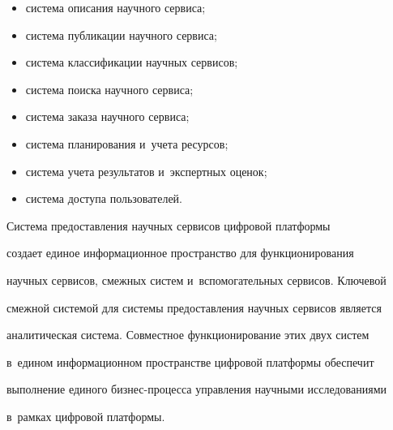      \begin{itemize}


     \item система описания научного сервиса;\\[-13.5pt]


     \item система публикации научного сервиса;\\[-13.5pt]


     \item система классификации научных сервисов;\\[-13.5pt]


     \item система поиска научного сервиса;\\[-13.5pt]


     \item система заказа научного сервиса;\\[-13.5pt]


     \item система планирования и~учета ресурсов;\\[-13.5pt]


     \item система учета результатов и~экспертных оценок;\\[-13.5pt]


     \item система доступа пользователей.


     \end{itemize}


     


     Система предоставления научных сервисов цифровой платформы 


создает единое информационное пространство для функционирования 


научных сервисов, смежных систем и~вспомогательных сервисов. Ключевой 


смежной системой для системы предоставления научных сервисов является 


аналитическая система. Совместное функционирование этих двух систем 


в~едином информационном пространстве цифровой платформы обеспечит 


выполнение единого бизнес-процесса управления научными исследованиями 


в~рамках цифровой платформы.


     


